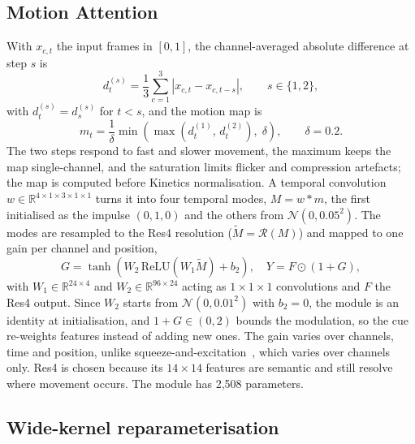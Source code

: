 \documentclass[conference]{IEEEtran}
\begin{document}
\subsection{Motion Attention}
\label{sec:ma}

With $x_{c,t}$ the input frames in $[0,1]$, the channel-averaged absolute
difference at step $s$ is
\begin{equation}
  d^{(s)}_t = \frac{1}{3} \sum_{c=1}^{3} \left| x_{c,t} - x_{c,t-s} \right|,
  \qquad s \in \{1, 2\},
  \label{eq:diff}
\end{equation}
with $d^{(s)}_t = d^{(s)}_s$ for $t < s$, and the motion map is
\begin{equation}
  m_t = \frac{1}{\delta}\min\!\left( \max\!\left(d^{(1)}_t,\, d^{(2)}_t\right),\; \delta \right),
  \qquad \delta = 0.2 .
  \label{eq:motion}
\end{equation}
The two steps respond to fast and slower movement, the maximum keeps the
map single-channel, and the saturation limits flicker and compression
artefacts; the map is computed before Kinetics normalisation. A temporal
convolution $w \in \mathbb{R}^{4 \times 1 \times 3 \times 1 \times 1}$
turns it into four temporal modes, $M = w * m$, the first initialised as
the impulse $(0,1,0)$ and the others from $\mathcal{N}(0, 0.05^2)$. The
modes are resampled to the Res4 resolution ($\tilde{M} = \mathcal{R}(M)$)
and mapped to one gain per channel and position,
\begin{equation}
  G = \tanh\!\left( W_2\, \mathrm{ReLU}\!\left(W_1 \tilde{M}\right) + b_2 \right),
  \quad Y = F \odot (1 + G),
  \label{eq:gate}
\end{equation}
with $W_1 \in \mathbb{R}^{24 \times 4}$ and $W_2 \in \mathbb{R}^{96 \times
24}$ acting as $1\times1\times1$ convolutions and $F$ the Res4 output.
Since $W_2$ starts from $\mathcal{N}(0, 0.01^2)$ with $b_2 = 0$, the module
is an identity at initialisation, and $1+G \in (0,2)$ bounds the
modulation, so the cue re-weights features instead of adding new ones. The
gain varies over channels, time and position, unlike
squeeze-and-excitation~\cite{se}, which varies over channels only. Res4 is
chosen because its $14\times14$ features are semantic and still resolve
where movement occurs. The module has 2{,}508 parameters.

\subsection{Wide-kernel reparameterisation}
\label{sec:wk}
\end{document}
